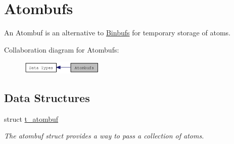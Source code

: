 \hypertarget{group__atombuf}{
\section{Atombufs}
\label{group__atombuf}
}


An Atombuf is an alternative to \hyperlink{group__binbuf}{Binbufs} for temporary storage of atoms.  


Collaboration diagram for Atombufs:\nopagebreak
\begin{figure}[H]
\begin{center}
\leavevmode
\includegraphics[width=112pt]{group__atombuf}
\end{center}
\end{figure}
\subsection*{Data Structures}
\begin{DoxyCompactItemize}
\item 
struct \hyperlink{structt__atombuf}{t\_\-atombuf}
\begin{DoxyCompactList}\small\item\em The atombuf struct provides a way to pass a collection of atoms. \item\end{DoxyCompactList}\end{DoxyCompactItemize}
